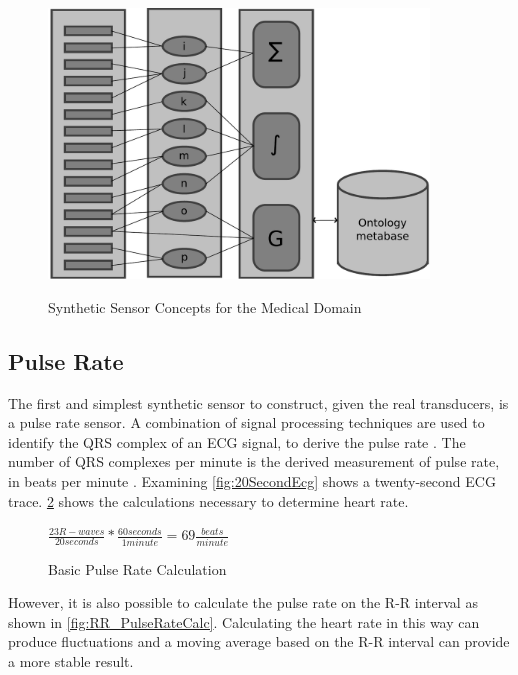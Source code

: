\begin{figure}
	\begin{center}
		\label{fig:SyntheticSensor}
		\includegraphics[scale=1,width=0.9\textwidth]{Images/syntheticSensor.pdf} 
		\caption{Synthetic Sensor Concepts for the Medical Domain}
	\end{center}
\end{figure}

\subsection{Pulse Rate}
\label{subsec:PulseRate}
The first and simplest synthetic sensor to construct, given the real transducers, is a pulse rate sensor. A combination of signal processing techniques are used to identify the QRS complex of an ECG signal, to derive the pulse rate  \cite{Chaitanya2011}. The number of QRS complexes per minute is the derived measurement of pulse rate, in beats per minute \cite{Scully2012}. Examining \cref{fig:20SecondEcg} shows a twenty-second ECG trace. \cref{fig:PulseRateCalc} shows the calculations necessary to determine heart rate.
\begin{figure}
	\begin{center}
		\label{fig:PulseRateCalc}
		$\frac{23 R-waves}{20 seconds}*\frac{60 seconds}{1 minute}=69 \frac{beats}{minute}$
		\caption{Basic Pulse Rate Calculation}
	\end{center}
\end{figure}

However, it is also possible to calculate the pulse rate on the R-R interval as shown in \cref{fig:RR_PulseRateCalc}. Calculating the heart rate in this way can produce fluctuations and a moving average based on the R-R interval can provide a more stable result.


